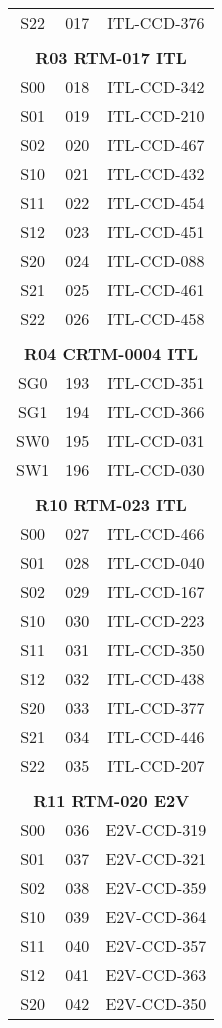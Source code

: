 \begin{longtable}{ccc}
  S22 & 017 & ITL-CCD-376 \\
 & & \\
\multicolumn{3}{c}{\bf R03  RTM-017  ITL} \\
\hline
  S00 & 018 & ITL-CCD-342 \\
  S01 & 019 & ITL-CCD-210 \\
  S02 & 020 & ITL-CCD-467 \\
  S10 & 021 & ITL-CCD-432 \\
  S11 & 022 & ITL-CCD-454 \\
  S12 & 023 & ITL-CCD-451 \\
  S20 & 024 & ITL-CCD-088 \\
  S21 & 025 & ITL-CCD-461 \\
  S22 & 026 & ITL-CCD-458 \\
 & & \\
\multicolumn{3}{c}{\bf R04  CRTM-0004  ITL} \\
\hline
  SG0 & 193 & ITL-CCD-351 \\
  SG1 & 194 & ITL-CCD-366 \\
  SW0 & 195 & ITL-CCD-031 \\
  SW1 & 196 & ITL-CCD-030 \\
 & & \\
\multicolumn{3}{c}{\bf R10  RTM-023  ITL} \\
\hline
  S00 & 027 & ITL-CCD-466 \\
  S01 & 028 & ITL-CCD-040 \\
  S02 & 029 & ITL-CCD-167 \\
  S10 & 030 & ITL-CCD-223 \\
  S11 & 031 & ITL-CCD-350 \\
  S12 & 032 & ITL-CCD-438 \\
  S20 & 033 & ITL-CCD-377 \\
  S21 & 034 & ITL-CCD-446 \\
  S22 & 035 & ITL-CCD-207 \\
 & & \\
\multicolumn{3}{c}{\bf R11  RTM-020  E2V} \\
\hline
  S00 & 036 & E2V-CCD-319 \\
  S01 & 037 & E2V-CCD-321 \\
  S02 & 038 & E2V-CCD-359 \\
  S10 & 039 & E2V-CCD-364 \\
  S11 & 040 & E2V-CCD-357 \\
  S12 & 041 & E2V-CCD-363 \\
  S20 & 042 & E2V-CCD-350 \\

\end{longtable}
